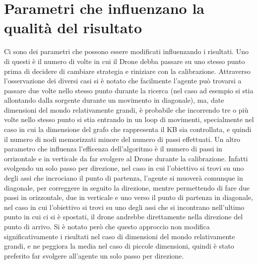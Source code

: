 \section{Parametri che influenzano la qualità del risultato}
Ci sono dei parametri che possono essere modificati influenzando i risultati. Uno di questi è il numero di volte in cui il Drone debba passare su uno stesso punto prima di decidere di cambiare strategia e riniziare con la calibrazione. Attraverso l'osservazione dei diversi casi si è notato che facilmente l'agente può trovarsi a passare due volte nello stesso punto durante la ricerca (nel caso ad esempio si stia allontando dalla sorgente durante un movimento in diagonale), ma, date dimensioni del mondo relativamente grandi, è probabile che incorrendo tre o più volte nello stesso punto si stia entrando in un loop di movimenti, specialmente nel caso in cui la dimensione del grafo che rappresenta il KB  sia controllata, e quindi il numero di nodi memorizzati minore del numero di passi effettuati.
Un altro parametro che influenza l'efficenza dell'algoritmo è il numero di passi in orrizontale e in verticale da far svolgere al Drone durante la calibrazione. Infatti svolgendo un solo passo per direzione, nel caso in cui l'obiettivo si trovi su uno degli assi che incrociano il punto di partenza, l'agente si muoverà comunque in diagonale, per correggere in seguito la direzione, mentre permettendo di fare due passi in orizzontale, due in verticale e uno verso il punto di partenza in diagonale, nel caso in cui l'obiettivo si trovi su uno degli assi che si incontrano nell'ultimo punto in cui ci si è spostati, il drone andrebbe direttamente nella direzione del punto di arrivo. Si è notato però che questo approccio non modifica significativamente i risultati nel caso di dimensioni del mondo relativamente grandi, e ne peggiora la media nel caso di piccole dimensioni, quindi è stato preferito far svolgere all'agente un solo passo per direzione.
	
